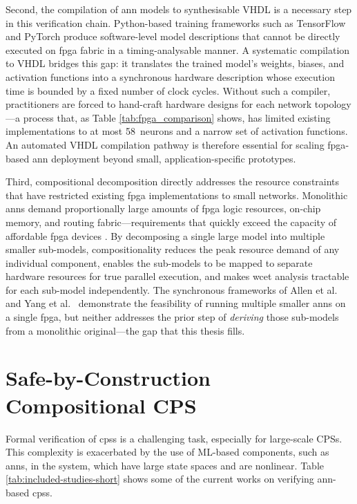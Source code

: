 Second, the compilation of \gls{ann} models to synthesisable VHDL is a necessary step in this verification chain. Python-based training frameworks such as TensorFlow \cite{martin_abadi_tensorflow_2015} and PyTorch \cite{paszke_pytorch_2019} produce software-level model descriptions that cannot be directly executed on \gls{fpga} fabric in a timing-analysable manner. A systematic compilation to VHDL bridges this gap: it translates the trained model's weights, biases, and activation functions into a synchronous hardware description whose execution time is bounded by a fixed number of clock cycles. Without such a compiler, practitioners are forced to hand-craft hardware designs for each network topology---a process that, as Table \ref{tab:fpga_comparison} shows, has limited existing implementations to at most 58~neurons and a narrow set of activation functions. An automated VHDL compilation pathway is therefore essential for scaling \gls{fpga}-based \gls{ann} deployment beyond small, application-specific prototypes.

Third, compositional decomposition directly addresses the resource constraints that have restricted existing \gls{fpga} implementations to small networks. Monolithic \glspl{ann} demand proportionally large amounts of \gls{fpga} logic resources, on-chip memory, and routing fabric---requirements that quickly exceed the capacity of affordable \gls{fpga} devices \cite{saric_fpga-based_2020-1, nguyen_efficient_2018}. By decomposing a single large model into multiple smaller sub-models, compositionality reduces the peak resource demand of any individual component, enables the sub-models to be mapped to separate hardware resources for true parallel execution, and makes \gls{wcet} analysis tractable for each sub-model independently. The synchronous frameworks of Allen et al.\ \cite{allen_compositional_2019} and Yang et al.\ \cite{yang_compositional_2020} demonstrate the feasibility of running multiple smaller \glspl{ann} on a single \gls{fpga}, but neither addresses the prior step of \emph{deriving} those sub-models from a monolithic original---the gap that this thesis fills.


\section{Safe-by-Construction Compositional CPS}
\label{sec:lit_safe_compositional}

Formal verification of \glspl{cps} is a challenging task, especially for large-scale CPSs. This complexity is exacerbated by the use of ML-based components, such as \glspl{ann}, in the system, which have large state spaces and are nonlinear. Table \ref{tab:included-studies-short} shows some of the current works on verifying \gls{ann}-based \glspl{cps}.


